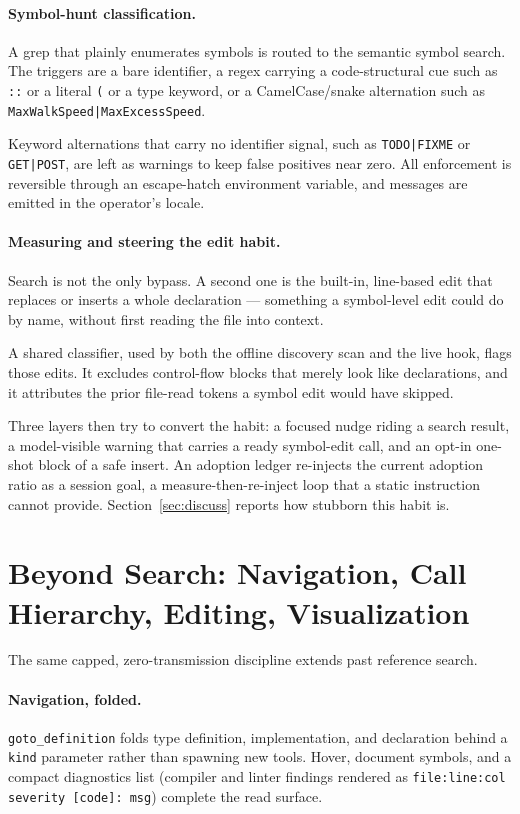 \documentclass[11pt]{article}
\begin{document}
\paragraph{Symbol-hunt classification.}
A grep that plainly enumerates symbols is routed to the semantic symbol search. The
triggers are a bare identifier, a regex carrying a code-structural cue such as
\texttt{::} or a literal \texttt{(} or a type keyword, or a CamelCase/snake
alternation such as \texttt{MaxWalkSpeed|MaxExcessSpeed}.

Keyword alternations that carry no identifier signal, such as \texttt{TODO|FIXME} or
\texttt{GET|POST}, are left as warnings to keep false positives near zero. All
enforcement is reversible through an escape-hatch environment variable, and messages
are emitted in the operator's locale.

\paragraph{Measuring and steering the edit habit.}
Search is not the only bypass. A second one is the built-in, line-based edit that
replaces or inserts a whole declaration --- something a symbol-level edit could do
by name, without first reading the file into context.

A shared classifier, used by both the offline discovery scan and the live hook,
flags those edits. It excludes control-flow blocks that merely look like
declarations, and it attributes the prior file-read tokens a symbol edit would have
skipped.

Three layers then try to convert the habit: a focused nudge riding a search result,
a model-visible warning that carries a ready symbol-edit call, and an opt-in
one-shot block of a safe insert. An adoption ledger re-injects the current adoption
ratio as a session goal, a measure-then-re-inject loop that a static instruction
cannot provide. Section~\ref{sec:discuss} reports how stubborn this habit is.

\section{Beyond Search: Navigation, Call Hierarchy, Editing, Visualization}
\label{sec:beyond}

The same capped, zero-transmission discipline extends past reference search.

\paragraph{Navigation, folded.}
\texttt{goto\_definition} folds type definition, implementation, and declaration
behind a \texttt{kind} parameter rather than spawning new tools. Hover, document
symbols, and a compact diagnostics list (compiler and linter findings rendered as
\texttt{file:line:col severity [code]: msg}) complete the read surface.
\end{document}
